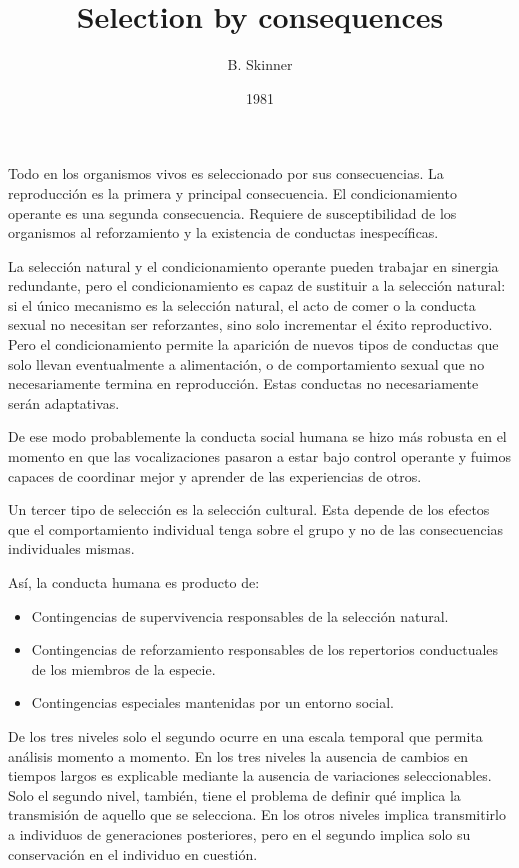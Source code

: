 \documentclass[a4paper,12pt]{article}
\title{Selection by consequences}
\author{B. Skinner}
\date{1981}
\begin{document}
{\scshape\bfseries \maketitle}

Todo en los organismos vivos es seleccionado por sus consecuencias. La reproducción es la primera y principal consecuencia. El condicionamiento operante es una segunda consecuencia. Requiere de susceptibilidad de los organismos al reforzamiento y la existencia de conductas inespecíficas.

La selección natural y el condicionamiento operante pueden trabajar en sinergia redundante, pero el condicionamiento es capaz de sustituir a la selección natural: si el único mecanismo es la selección natural, el acto de comer o la conducta sexual no necesitan ser reforzantes, sino solo incrementar el éxito reproductivo. Pero el condicionamiento permite la aparición de nuevos tipos de conductas que solo llevan eventualmente a alimentación, o de comportamiento sexual que no necesariamente termina en reproducción. Estas conductas no necesariamente serán adaptativas.

De ese modo probablemente la conducta social humana se hizo más robusta en el momento en que las vocalizaciones pasaron a estar bajo control operante y fuimos capaces de coordinar mejor y aprender de las experiencias de otros.

Un tercer tipo de selección es la selección cultural. Esta depende de los efectos que el comportamiento individual tenga sobre el grupo y no de las consecuencias individuales mismas.

Así, la conducta humana es producto de:
\begin{itemize}
        \item Contingencias de supervivencia responsables de la selección natural.
        \item Contingencias de reforzamiento responsables de los repertorios conductuales de los miembros de la especie.
        \item Contingencias especiales mantenidas por un entorno social.
\end{itemize}

De los tres niveles solo el segundo ocurre en una escala temporal que permita análisis momento a momento. En los tres niveles la ausencia de cambios en tiempos largos es explicable mediante la ausencia de variaciones seleccionables. Solo el segundo nivel, también, tiene el problema de definir qué implica la transmisión de aquello que se selecciona. En los otros niveles implica transmitirlo a individuos de generaciones posteriores, pero en el segundo implica solo su conservación en el individuo en cuestión.
\end{document}
